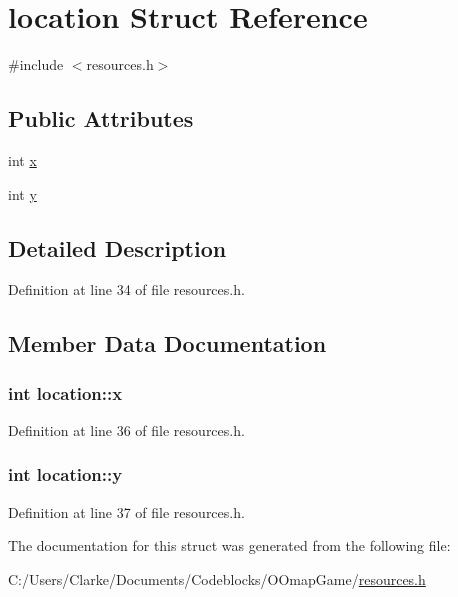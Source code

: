 \hypertarget{structlocation}{\section{location Struct Reference}
\label{structlocation}
}


{\ttfamily \#include $<$resources.\-h$>$}

\subsection*{Public Attributes}
\begin{DoxyCompactItemize}
\item 
int \hyperlink{structlocation_aacd18b2506c49d221cfc37b2119e3c3c}{x}
\item 
int \hyperlink{structlocation_ad7197d1981d4ea5d8b36041473cac815}{y}
\end{DoxyCompactItemize}


\subsection{Detailed Description}


Definition at line 34 of file resources.\-h.



\subsection{Member Data Documentation}
\hypertarget{structlocation_aacd18b2506c49d221cfc37b2119e3c3c}{
\subsubsection[{x}]{\setlength{\rightskip}{0pt plus 5cm}int location\-::x}}\label{structlocation_aacd18b2506c49d221cfc37b2119e3c3c}


Definition at line 36 of file resources.\-h.

\hypertarget{structlocation_ad7197d1981d4ea5d8b36041473cac815}{
\subsubsection[{y}]{\setlength{\rightskip}{0pt plus 5cm}int location\-::y}}\label{structlocation_ad7197d1981d4ea5d8b36041473cac815}


Definition at line 37 of file resources.\-h.



The documentation for this struct was generated from the following file\-:\begin{DoxyCompactItemize}
\item 
C\-:/\-Users/\-Clarke/\-Documents/\-Codeblocks/\-O\-Omap\-Game/\hyperlink{resources_8h}{resources.\-h}\end{DoxyCompactItemize}
